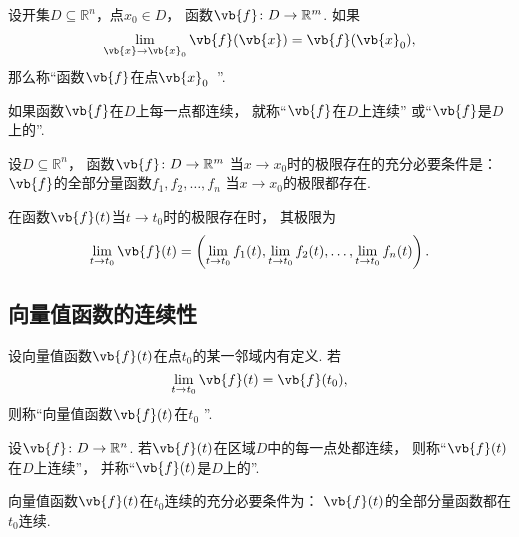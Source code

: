 \begin{definition}
设开集\(D \subseteq \mathbb{R}^n\)，点\(x_0 \in D\)，
函数\(\vb{f}\colon D \to \mathbb{R}^m\).
如果\[
	\lim_{\vb{x}\to\vb{x}_0} \vb{f}(\vb{x})
	= \vb{f}(\vb{x}_0),
\]
那么称“函数\(\vb{f}\)在点\(\vb{x}_0\)~”.

如果函数\(\vb{f}\)在\(D\)上每一点都连续，
就称“\(\vb{f}\)在\(D\)上连续”
或“\(\vb{f}\)是\(D\)上的”.
\end{definition}

\begin{theorem}
设\(D \subseteq \mathbb{R}^n\)，
函数\(\vb{f}\colon D \to \mathbb{R}^m\)
当\(x \to x_0\)时的极限存在的充分必要条件是：
\(\vb{f}\)的全部分量函数\(f_1,f_2,\dotsc,f_n\)
当\(x \to x_0\)的极限都存在.
\end{theorem}

\begin{theorem}
在函数\(\vb{f}(t)\)当\(t \to t_0\)时的极限存在时，
其极限为\begin{equation}\label{equation:一元实变向量值函数.向量值函数的极限与分量函数的极限的关系}
	\lim_{t \to t_0} \vb{f}(t)
	= \left(
			\lim_{t \to t_0} f_1(t),
			\lim_{t \to t_0} f_2(t),
			\dotsc,
			\lim_{t \to t_0} f_n(t)
		\right).
\end{equation}
\end{theorem}

\subsection{向量值函数的连续性}
\begin{definition}
设向量值函数\(\vb{f}(t)\)在点\(t_0\)的某一邻域内有定义.
若\[
	\lim_{t \to t_0} \vb{f}(t) = \vb{f}(t_0),
\]
则称“向量值函数\(\vb{f}(t)\)在\(t_0\) ”.
\end{definition}

\begin{definition}
设\(\vb{f}\colon D\to\mathbb{R}^n\).
若\(\vb{f}(t)\)在区域\(D\)中的每一点处都连续，
则称“\(\vb{f}(t)\)在\(D\)上连续”，
并称“\(\vb{f}(t)\)是\(D\)上的”.
\end{definition}

\begin{theorem}
向量值函数\(\vb{f}(t)\)在\(t_0\)连续的充分必要条件为：
\(\vb{f}(t)\)的全部分量函数都在\(t_0\)连续.
\end{theorem}

